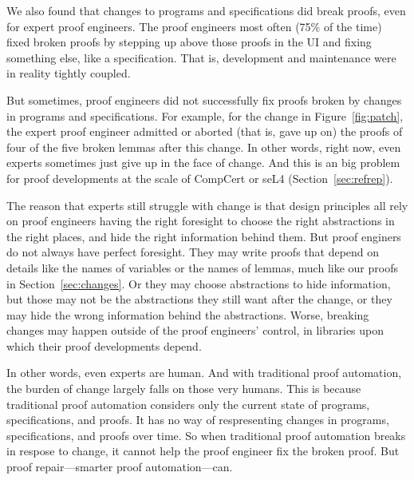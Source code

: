 We also found that changes to programs and specifications did break proofs, even for expert proof engineers.
The proof engineers most often (75\% of the time) fixed broken proofs by stepping 
up above those proofs in the UI and fixing something else, like a specification.
That is, development and maintenance were in reality tightly coupled.

But sometimes, proof engineers did not successfully fix proofs broken by changes in programs and specifications.
For example, for the change in Figure~\ref{fig:patch},
the expert proof engineer admitted or aborted (that is, gave up on) the proofs of four of the five
broken lemmas after this change.
In other words, right now, even experts sometimes just give up in the face of change.
And this is an big problem for proof developments
at the scale of CompCert or seL4 (Section~\ref{sec:refrep}).

The reason that experts still struggle with change is that
design principles all rely on proof engineers having the right foresight to choose the 
right abstractions in the right places, and hide the right information behind them.
But proof enginers do not always have perfect foresight.
They may write proofs that depend on details like the names of variables or the names of lemmas,
much like our proofs in Section~\ref{sec:changes}.
Or they may choose abstractions to hide information, but those may not be the abstractions they still want after the change,
or they may hide the wrong information behind the abstractions.
Worse, breaking changes may happen outside of the proof engineers' control,
in libraries upon which their proof developments depend.

In other words, even experts are human.
And with traditional proof automation, the burden of change largely falls on those very humans.
This is because traditional proof automation considers only the current state of programs, specifications, and proofs.
It has no way of respresenting changes in programs, specifications, and proofs over time.
So when traditional proof automation breaks in respose to change, it cannot help the proof engineer fix the broken proof.
But proof repair---smarter proof automation---can.


%

%

%

